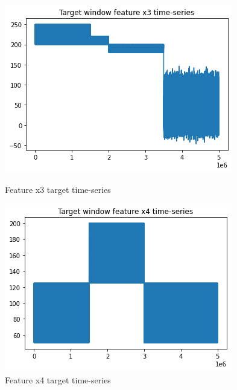 \begin{figure}[!htb]
  \begin{minipage}[b]{0.5\linewidth}
    \centering
    \includegraphics[width=1\linewidth]{figures/timeseries-t6-x3.png} 
    \caption{Feature x3 target time-series} 
    \label{fig:timeseries-t6-x3} 
    \vspace{4ex}
  \end{minipage}%
  \begin{minipage}[b]{0.5\linewidth}
    \centering
    \includegraphics[width=1\linewidth]{figures/timeseries-t6-x4.png} 
    \caption{Feature x4 target time-series} 
    \label{fig:timeseries-t6-x4} 
    \vspace{4ex}
  \end{minipage} 
\end{figure}

